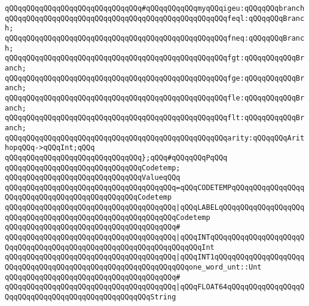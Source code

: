 \verb|qQQqqQQqqQQqqQQqqQQqqQQqqQQqqQQq#qQQqqQQqqQQqmyqQQqigeu:qQQqqQQqbranch|\newline
\newline
\verb|qQQqqQQqqQQqqQQqqQQqqQQqqQQqqQQqqQQqqQQqqQQqqQQqqQQqfeql:qQQqqQQqBranch;|\newline
\verb|qQQqqQQqqQQqqQQqqQQqqQQqqQQqqQQqqQQqqQQqqQQqqQQqqQQqfneq:qQQqqQQqBranch;|\newline
\verb|qQQqqQQqqQQqqQQqqQQqqQQqqQQqqQQqqQQqqQQqqQQqqQQqqQQqfgt:qQQqqQQqqQQqBranch;|\newline
\verb|qQQqqQQqqQQqqQQqqQQqqQQqqQQqqQQqqQQqqQQqqQQqqQQqqQQqfge:qQQqqQQqqQQqBranch;|\newline
\verb|qQQqqQQqqQQqqQQqqQQqqQQqqQQqqQQqqQQqqQQqqQQqqQQqqQQqfle:qQQqqQQqqQQqBranch;|\newline
\verb|qQQqqQQqqQQqqQQqqQQqqQQqqQQqqQQqqQQqqQQqqQQqqQQqqQQqflt:qQQqqQQqqQQqBranch;|\newline
\newline
\verb|qQQqqQQqqQQqqQQqqQQqqQQqqQQqqQQqqQQqqQQqqQQqqQQqqQQqarity:qQQqqQQqArithopqQQq->qQQqInt;qQQq|\newline
\newline
\verb|qQQqqQQqqQQqqQQqqQQqqQQqqQQqqQQq};qQQq#qQQqqQQqPqQQq|\newline
\newline
\verb|qQQqqQQqqQQqqQQqqQQqqQQqqQQqqQQqCodetemp;|\newline
\newline
\verb|qQQqqQQqqQQqqQQqqQQqqQQqqQQqqQQqValueqQQq|\newline
\verb|qQQqqQQqqQQqqQQqqQQqqQQqqQQqqQQqqQQqqQQq=qQQqCODETEMPqQQqqQQqqQQqqQQqqQQqqQQqqQQqqQQqqQQqqQQqqQQqqQQqCodetemp|\newline
\verb|qQQqqQQqqQQqqQQqqQQqqQQqqQQqqQQqqQQqqQQq|\verb#|qQQqLABELqQQqqQQqqQQqqQQqqQQqqQQqqQQqqQQqqQQqqQQqqQQqqQQqqQQqqQQqqQQqCodetemp#\newline
\verb|qQQqqQQqqQQqqQQqqQQqqQQqqQQqqQQqqQQqqQQq#|\newline
\verb|qQQqqQQqqQQqqQQqqQQqqQQqqQQqqQQqqQQqqQQq|\verb#|qQQqINTqQQqqQQqqQQqqQQqqQQqqQQqqQQqqQQqqQQqqQQqqQQqqQQqqQQqqQQqqQQqqQQqqQQqInt#\newline
\verb|qQQqqQQqqQQqqQQqqQQqqQQqqQQqqQQqqQQqqQQq|\verb#|qQQqINT1qQQqqQQqqQQqqQQqqQQqqQQqqQQqqQQqqQQqqQQqqQQqqQQqqQQqqQQqqQQqqQQqone_word_unt::Unt#\newline
\verb|qQQqqQQqqQQqqQQqqQQqqQQqqQQqqQQqqQQqqQQq#|\newline
\verb|qQQqqQQqqQQqqQQqqQQqqQQqqQQqqQQqqQQqqQQq|\verb#|qQQqFLOAT64qQQqqQQqqQQqqQQqqQQqqQQqqQQqqQQqqQQqqQQqqQQqqQQqqQQqString#\newline
